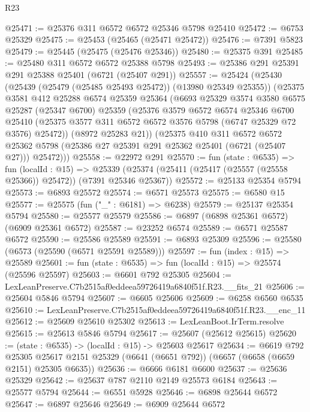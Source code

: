 \begin{lexlean}{R23}
\begin{coremodule}
@25471 := @25376 @311 @6572 @6572 @25346 @5798 @25410
@25472 := @6753 @25329
@25475 := @25453 (@25465 (@25471 @25472))
@25476 := @7391 @5823
@25479 := @25445 (@25475 (@25476 @25346))
@25480 := @25375 @391
@25485 := @25480 @311 @6572 @6572 @25388 @5798
@25493 := @25386 @291 @25391 @291 @25388 @25401 (@6721 (@25407 @291))
@25557 := @25424
    (@25430
      (@25439 (@25479 (@25485 @25493 @25472)) (@13980 @25349 @25355))
      (@25375
        @3581
        @412
        @25288
        @6574
        @25359
        @25364
        (@6693
          @25329
          @3574
          @3580
          @6575
          @25287
          (@25347 @6700)
          @25359
          (@25376
            @3579
            @6572
            @6574
            @25346
            @6700
            @25410
            (@25375 @3577 @311 @6572 @6572 @3576 @5798 (@6747 @25329 @72 @3576) @25472))
          (@8972 @25283 @21))
        (@25375
          @410
          @311
          @6572
          @6572
          @25362
          @5798
          (@25386 @27 @25391 @291 @25362 @25401 (@6721 (@25407 @27)))
          @25472)))
@25558 := @22972 @291
@25570 := fun (state : @6535) =>
  fun (localId : @15) =>
  @25339 (@25374 (@25411 (@25417 (@25557 (@25558 @25366)) @25472)) (@7391 @25346 @25367))
@25572 := @25133 @25354 @5794
@25573 := @6893 @25572
@25574 := @6571 @25573
@25575 := @6580 @15
@25577 := @25575 (fun ("_" : @6181) => @6238)
@25579 := @25137 @25354 @5794
@25580 := @25577 @25579
@25586 := @6897 (@6898 @25361 @6572) (@6909 @25361 @6572)
@25587 := @23252 @6574
@25589 := @6571 @25587 @6572
@25590 := @25586 @25589
@25591 := @6893 @25309
@25596 := @25580 (@6573 (@25590 (@6571 @25591 @25589)))
@25597 := fun (index : @15) => @25589
@25601 := fun (state : @6535) => fun (localId : @15) => @25574 (@25596 @25597)
@25603 := @6601 @792 @25305
@25604 := LexLeanPreserve.C7b2515af0eddeea59726419a6840f51f.R23.__fits_21
@25606 := @25604 @5846 @5794
@25607 := @6605 @25606
@25609 := @6258 @6560 @6535
@25610 := LexLeanPreserve.C7b2515af0eddeea59726419a6840f51f.R23.__enc_11
@25612 := @25609 @25610 @25302
@25613 := LexLeanBoot.IrTerm.resolve
@25615 := @25613 @5846 @5794
@25617 := @25607 (@25612 @25615)
@25620 := (state : @6535) -> (localId : @15) -> @25603 @25617
@25634 := @6619
    @792
    @25305
    @25617
    @2151
    @25329
    (@6641 (@6651 @792))
    (@6657 (@6658 (@6659 @2151) @25305 @6635))
@25636 := @6666 @6181 @6600
@25637 := @25636 @25329
@25642 := @25637 @787 @2110 @2149 @25573 @6184
@25643 := @25577 @5794
@25644 := @6551 @5928
@25646 := @6898 @25644 @6572
@25647 := @6897 @25646
@25649 := @6909 @25644 @6572

\end{coremodule}
\end{lexlean}

